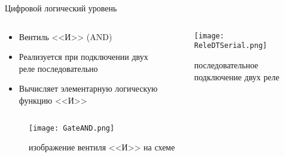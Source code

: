 \documentclass[aspectratio=169,14pt]{beamer}
\begin{document}
\begin{frame}{Цифровой логический уровень}
    \begin{columns}[T,onlytextwidth]
        \begin{column}{0.5\textwidth}
            \begin{itemize}
                \item Вентиль <<И>> (AND)
                \item Реализуется при подключении двух реле последовательно
                \item Вычисляет элементарную логическую функцию <<И>>
            \end{itemize}
        \end{column}
        \begin{column}{0.5\textwidth}
            \begin{figure}[htp]
                \centering
                \texttt{[image: ReleDTSerial.png]}
                \caption{\tiny{последовательное подключение двух реле}}
                \label{fig:ReleDTSerial}
            \end{figure}
        \end{column}
    \end{columns}
    \begin{figure}[htp]
        \centering
        \texttt{[image: GateAND.png]}
        \caption{\tiny{изображение вентиля <<И>> на схеме}}
        \label{fig:GateAND}
    \end{figure}
\end{frame}
\end{document}
